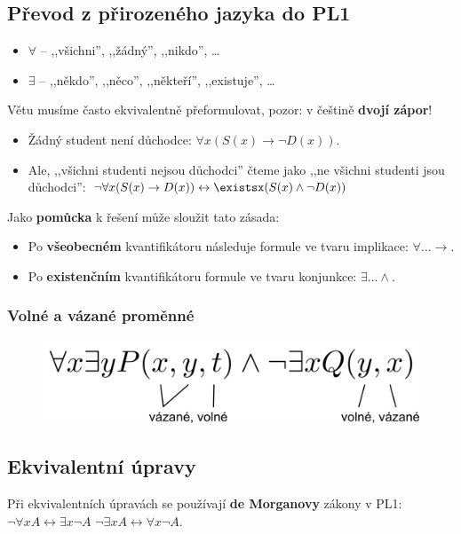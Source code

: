 \subsection{Převod z přirozeného jazyka do PL1}
\begin{itemize}
\item $\forall$ -- ,,všichni'', ,,žádný'', ,,nikdo'', \ldots
\item $\exists$ --  ,,někdo'', ,,něco'', ,,někteří'', ,,existuje'', \ldots
\end{itemize}

\noindent Větu musíme často ekvivalentně přeformulovat, pozor: v češtině \textbf{dvojí zápor}!
\begin{itemize}
\item Žádný student není důchodce: $\forall x (S(x) \rightarrow \neg D(x))$.
\item Ale, ,,všichni studenti nejsou důchodci'' čteme jako ,,ne všichni studenti jsou důchodci'': 
$\neg \forall x (S(x) \rightarrow D(x)) \leftrightarrow \existsx (S(x) \land \neg D(x))$
\end{itemize}

\noindent Jako \textbf{pomůcka} k řešení může sloužit tato zásada:
\begin{itemize}
\item Po \textbf{všeobecném} kvantifikátoru následuje formule ve tvaru implikace: $\forall \ldots \rightarrow$.
\item Po \textbf{existenčním} kvantifikátoru formule ve tvaru konjunkce:  $\exists \ldots \land$.
\end{itemize}

\subsubsection{Volné a vázané proměnné}
\begin{figure}[H]
	\centering
	\includegraphics[width=.6\textwidth]{assets/volne_vazane}
\end{figure}

\subsection{Ekvivalentní úpravy}
Při ekvivalentních úpravách se používají \textbf{de Morganovy} zákony v PL1: $\neg \forall xA \leftrightarrow \exists x\neg A$ \qquad $\neg \exists xA \leftrightarrow \forall x\neg A$.


